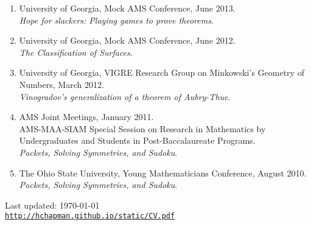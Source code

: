 \documentclass[letterpaper]{article}
\def\footerlink{http://hchapman.github.io/static/CV.pdf}
\begin{document}
\begin{enumerate}
\item University of Georgia, Mock AMS Conference, June 2013.\\
  \textit{Hope for slackers: Playing games to prove theorems}.
\item University of Georgia, Mock AMS Conference, June 2012.\\
  \textit{The Classification of Surfaces}.
\item University of Georgia, VIGRE Research Group on Minkowski's
  Geometry of Numbers, March 2012.\\
  \textit{Vinogradov's generalization of a theorem of Aubry-Thue}.
\item AMS Joint Meetings, January 2011.\\
  AMS-MAA-SIAM Special Session on Research in Mathematics by
  Undergraduates and Students in Post-Baccalaureate Programs.\\
  \textit{Packets, Solving Symmetries, and Sudoku}.
\item The Ohio State University, Young Mathematicians Conference,
  August 2010.\\
  \textit{Packets, Solving Symmetries, and Sudoku}.
\end{enumerate}

\bigskip

\begin{center}
  \begin{footnotesize}
    Last updated: \today \\
    \href{\footerlink}{\texttt{\footerlink}}
  \end{footnotesize}
\end{center}
\end{document}
